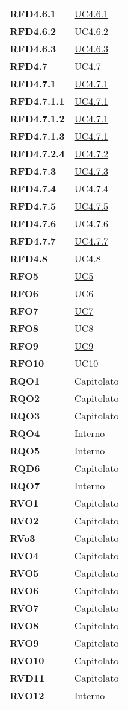 \begin{longtable}[H]{>{\centering\bfseries}m{8cm} >{\centering\arraybackslash}m{8cm}}
    RFD4.6.1 & \hyperref[par:uc4.6.1]{UC4.6.1} \\
    RFD4.6.2 & \hyperref[par:uc4.6.2]{UC4.6.2} \\
    RFD4.6.3 & \hyperref[par:uc4.6.3]{UC4.6.3} \\
    RFD4.7 & \hyperref[ssub:uc4.7]{UC4.7} \\
    RFD4.7.1 & \hyperref[par:uc4.7.1]{UC4.7.1} \\
    RFD4.7.1.1 & \hyperref[par:uc4.7.1]{UC4.7.1} \\
    RFD4.7.1.2 & \hyperref[par:uc4.7.1]{UC4.7.1} \\
    RFD4.7.1.3 & \hyperref[par:uc4.7.1]{UC4.7.1} \\
    RFD4.7.2.4 & \hyperref[par:uc4.7.2]{UC4.7.2} \\
    RFD4.7.3 & \hyperref[par:uc4.7.3]{UC4.7.3} \\
    RFD4.7.4 & \hyperref[par:uc4.7.4]{UC4.7.4} \\
    RFD4.7.5 & \hyperref[par:uc4.7.5]{UC4.7.5} \\
    RFD4.7.6 & \hyperref[par:uc4.7.6]{UC4.7.6} \\
    RFD4.7.7 & \hyperref[par:uc4.7.7]{UC4.7.7} \\
    RFD4.8 & \hyperref[ssub:uc4.8]{UC4.8} \\
    RFO5 & \hyperref[sub:uc5]{UC5} \\
    RFO6 & \hyperref[sub:uc6]{UC6} \\
    RFO7 & \hyperref[sub:uc7]{UC7} \\
    RFO8 & \hyperref[sub:uc8]{UC8} \\
    RFO9 & \hyperref[sub:uc9]{UC9} \\
    RFO10 & \hyperref[sub:uc10]{UC10} \\
    RQO1 & Capitolato \\
    RQO2 & Capitolato \\
    RQO3 & Capitolato \\
    RQO4 & Interno \\
    RQO5 & Interno \\
    RQD6 & Capitolato \\
    RQO7 & Interno \\
    RVO1 & Capitolato \\
    RVO2 & Capitolato \\
    RVo3 & Capitolato \\
    RVO4 & Capitolato \\
    RVO5 & Capitolato \\
    RVO6 & Capitolato \\
    RVO7 & Capitolato \\
    RVO8 & Capitolato \\
    RVO9 & Capitolato \\
    RVO10 & Capitolato \\
    RVD11 & Capitolato \\
    RVO12 & Interno
\end{longtable}
